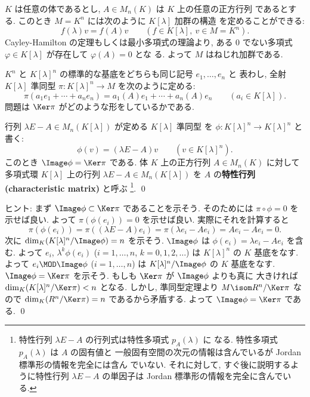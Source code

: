 \documentclass[12pt,twoside]{jarticle}
\begin{document}
$K$ は任意の体であるとし, $A\in M_n(K)$ は $K$ 上の任意の正方行列
であるとする.  このとき $M=K^n$ には次のように $K[\lambda]$ 加群の構造
を定めることができる: 
\begin{equation*}
  f(\lambda)v = f(A)v
  \qquad
  (f\in K[\lambda],\ v\in M=K^n).
\end{equation*}
Cayley-Hamilton の定理もしくは最小多項式の理論より, 
ある $0$ でない多項式 $\varphi\in K[\lambda]$ が存在して $\varphi(A)=0$ とな
る.  よって $M$ はねじれ加群である.  

$K^n$ と $K[\lambda]^n$ の標準的な基底をどちらも同じ記号 $e_1,\dots,e_n$ と
表わし, 全射 $K[\lambda]$ 準同型 $\pi:K[\lambda]^n\to M$ を次のように定める:
\begin{equation*}
  \pi(a_1e_1+\cdots+a_ne_n) = a_1(A)e_1+\cdots+a_n(A)e_n
  \qquad (a_i\in K[\lambda]).
\end{equation*}
問題は $\Ker\pi$ がどのような形をしているかである.

\begin{question}[特性行列]
\label{q:xE-A}
  行列 $\lambda E - A\in M_n(K[\lambda])$ が定める $K[\lambda]$ 準同型
  を $\phi:K[\lambda]^n\to K[\lambda]^n$ と書く:
  \begin{equation*}
    \phi(v) = (\lambda E - A)v
    \qquad (v \in K[\lambda]^n).
  \end{equation*}
  このとき $\Image\phi=\Ker\pi$ である.
  体 $K$ 上の正方行列 $A\in M_n(K)$ に対して
  多項式環 $K[\lambda]$ 上の行列 $\lambda E - A\in M_n(K[\lambda])$ 
  を $A$ の{\bf 特性行列 (characteristic matrix)} と呼ぶ%
  \footnote{特性行列 $\lambda E - A$ の行列式は特性多項式 $p_A(\lambda)$ に
    なる.  特性多項式 $p_A(\lambda)$ は $A$ の固有値と
    一般固有空間の次元の情報は含んでいるが Jordan 標準形の情報を完全には含ん
    でいない. それに対して, すぐ後に説明するように特性行列 $\lambda E - A$ 
    の単因子は Jordan 標準形の情報を完全に含んでいる.}. 
  \qed
\end{question}

\noindent
ヒント: まず $\Image\phi\subset\Ker\pi$ であることを示そう.
そのためには $\pi\circ\phi = 0$ を示せば良い.
よって $\pi(\phi(e_i)) = 0$ を示せば良い.
実際にそれを計算すると
\begin{equation*}
  \pi(\phi(e_i)) 
  = \pi((\lambda E - A)e_i)
  = \pi(\lambda e_i - Ae_i)
  = Ae_i - Ae_i 
  = 0.
\end{equation*}
次に $\dim_K(K[\lambda]^n/\Image\phi)=n$ を示そう.
$\Image\phi$ は $\phi(e_i)=\lambda e_i - Ae_i$ を含む.
よって $e_i$, $\lambda^k\phi(e_i)$ ($i=1,\dots,n$, $k=0,1,2,\ldots$) 
は $K[\lambda]^n$ の $K$ 基底をなす. 
よって $e_i\MOD\Image\phi$ ($i=1,\dots,n$) 
は $K[\lambda]^n/\Image\phi$ の $K$ 基底をなす.
$\Image\phi=\Ker\pi$ を示そう.
もしも $\Ker\pi$ が $\Image\phi$ よりも真に
大きければ $\dim_K(K[\lambda]^n/\Ker\pi)<n$ となる.
しかし, 準同型定理より $M\isom R^n/\Ker\pi$ 
なので $\dim_K(R^n/\Ker\pi)=n$ であるから矛盾する.
よって $\Image\phi=\Ker\pi$ である.
\qed
\end{document}
